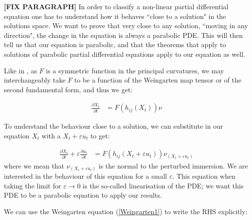 {\vspace{10pt}\LARGE \bf [FIX PARAGRAPH]}
In order to classify a non-linear partial differential equation one has to understand how it behaves ``close to a solution" in the solutions space. We want to prove that very close to any solution, ``moving in any direction", the change in the equation is always a parabolic PDE. This will then tell us that our equation is parabolic, and that the theorems that apply to solutions of parabolic partial differential equations apply to our equation as well. 

Like in \cite{huisken}, as $F$ is a symmetric function in the principal curvatures, we may interchangeably take $F$ to be a function of the Weingarten map tensor or of the second fundamental form, and thus we get:

\begin{align*}
	\frac{\partial X_t}{\partial t} &= F(h_{ij}(X_t)) \nu
\end{align*}

To understand the behaviour close to a solution, we can substitute in our equation $X_t$ with a $X_t+\varepsilon u_t$ to get:

\begin{align}
	\frac{\partial X_t}{\partial t} + \varepsilon\frac{\partial u_t}{\partial t}  &= F(h_{ij}(X_t+\varepsilon u_t)) \nu_{(X_t+\varepsilon u_t)}\label{linearizingevolutioneq}
\end{align}
where we mean that  $\nu_{(X_t+\varepsilon u_t)}$ is the normal to the perturbed immersion. 
We are interested in the behaviour of this equation for a small $\varepsilon$. This equation when taking the limit for $\varepsilon \rightarrow 0$ is the so-called linearisation of the PDE; we want this PDE to be a parabolic equation to apply our results.

We can use the Weingarten equation (\ref{Weingarten1}) to write the RHS explicitly:

